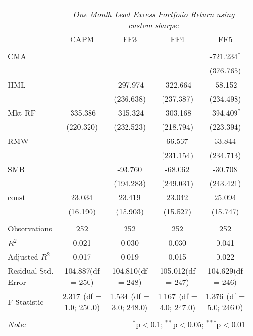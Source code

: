 \begin{table}[!htbp] \centering
\begin{tabular}{@{\extracolsep{5pt}}lcccc}
\\[-1.8ex]\hline
\hline \\[-1.8ex]
& \multicolumn{4}{c}{\textit{One Month Lead Excess Portfolio Return using custom sharpe:}} \
\cr \cline{4-5}
\\[-1.8ex] & CAPM & FF3 & FF4 & FF5 \\
\hline \\[-1.8ex]
 CMA & & & & -721.234$^{*}$ \\
  & & & & (376.766) \\
 HML & & -297.974$^{}$ & -322.664$^{}$ & -58.152$^{}$ \\
  & & (236.638) & (237.387) & (234.498) \\
 Mkt-RF & -335.386$^{}$ & -315.324$^{}$ & -303.168$^{}$ & -394.409$^{*}$ \\
  & (220.320) & (232.523) & (218.794) & (223.394) \\
 RMW & & & 66.567$^{}$ & 33.844$^{}$ \\
  & & & (231.154) & (234.713) \\
 SMB & & -93.760$^{}$ & -68.062$^{}$ & -30.708$^{}$ \\
  & & (194.283) & (249.031) & (243.421) \\
 const & 23.034$^{}$ & 23.419$^{}$ & 23.042$^{}$ & 25.094$^{}$ \\
  & (16.190) & (15.903) & (15.527) & (15.747) \\
\hline \\[-1.8ex]
 Observations & 252 & 252 & 252 & 252 \\
 $R^2$ & 0.021 & 0.030 & 0.030 & 0.041 \\
 Adjusted $R^2$ & 0.017 & 0.019 & 0.015 & 0.022 \\
 Residual Std. Error & 104.887(df = 250) & 104.810(df = 248) & 105.012(df = 247) & 104.629(df = 246)  \\
 F Statistic & 2.317$^{}$ (df = 1.0; 250.0) & 1.534$^{}$ (df = 3.0; 248.0) & 1.167$^{}$ (df = 4.0; 247.0) & 1.376$^{}$ (df = 5.0; 246.0) \\
\hline
\hline \\[-1.8ex]
\textit{Note:} & \multicolumn{4}{r}{$^{*}$p$<$0.1; $^{**}$p$<$0.05; $^{***}$p$<$0.01} \\
\end{tabular}
\end{table}
